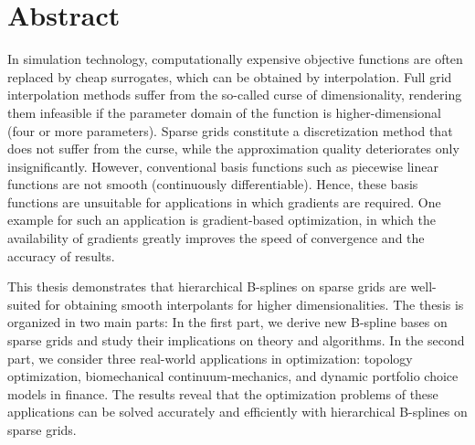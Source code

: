 
\printornamentsfalse

\section*{Abstract}

In simulation technology, computationally expensive objective functions
are often replaced by cheap surrogates,
which can be obtained by interpolation.
Full grid interpolation methods suffer from the
so-called curse of dimensionality,
rendering them infeasible if the parameter domain of the function
is higher-dimensional (four or more parameters).
Sparse grids constitute a discretization method that does not suffer from the
curse, while the approximation quality deteriorates only insignificantly.
However, conventional basis functions such as piecewise linear functions
are not smooth (continuously differentiable).
Hence, these basis functions are unsuitable for applications
in which gradients are required.
One example for such an application is gradient-based optimization,
in which the availability of gradients greatly improves the speed of
convergence and the accuracy of results.

This thesis demonstrates that hierarchical B-splines on sparse grids are
well-suited for obtaining smooth interpolants for higher dimensionalities.
The thesis is organized in two main parts:
In the first part, we derive new B-spline bases on sparse grids and study
their implications on theory and algorithms.
In the second part, we consider three real-world applications in optimization:
topology optimization, biomechanical continuum-mechanics, and
dynamic portfolio choice models in finance.
The results reveal that the optimization problems of these applications
can be solved accurately and efficiently with hierarchical B-splines on
sparse grids.

\newpage

